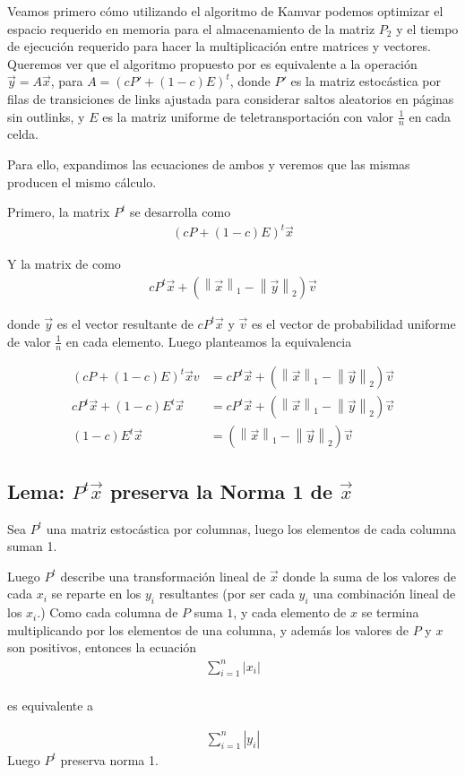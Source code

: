 Veamos primero cómo utilizando el algoritmo de Kamvar podemos optimizar el espacio requerido en memoria para el almacenamiento de la matriz $P_2$ y el tiempo de ejecución requerido para hacer la multiplicación entre matrices y vectores.\\

\newcommand{\vectornorm}[1]{\left\|#1\right\|}
Queremos ver que el algoritmo propuesto por \cite[Algoritmo 1]{Kamvar2003} es equivalente
a la operación $\vec{y} = A\vec{x}$, para $A=(cP' + (1-c)E)^{t}$, donde $P'$ es la matriz 
estocástica por filas de transiciones de links ajustada para considerar saltos aleatorios
en páginas sin outlinks, y $E$ es la matriz uniforme de teletransportación con valor $\frac{1}{n}$ en cada celda.

Para ello, expandimos las ecuaciones de ambos y veremos que las mismas producen el mismo cálculo.

Primero, la matrix $P^{t}$ se desarrolla como 
\begin{align*}
(cP + (1 - c)E)^{t} \vec{x}
\end{align*}

Y la matrix de \cite[Algoritmo 1]{Kamvar 2003} como
\begin{align*}
cP^{t}\vec{x} + (\vectornorm{\vec{x}}_1 - \vectornorm{\vec{y}}_2)\vec{v}
\end{align*}

donde $\vec{y}$ es el vector resultante de $cP^{t}\vec{x}$ y $\vec{v}$ es el vector de probabilidad
uniforme de valor $\frac{1}{n}$ en cada elemento. Luego planteamos la equivalencia

\begin{align*}
(cP + (1-c)E)^{t} \vec{x} v&= cP^{t}\vec{x} + (\vectornorm{\vec{x}}_1 - \vectornorm{\vec{y}}_2)\vec{v} \\
cP^{t}\vec{x} + (1-c)E^{t}\vec{x} &= cP^{t}\vec{x} + (\vectornorm{\vec{x}}_1 - \vectornorm{\vec{y}}_2)\vec{v} \\
(1-c)E^{t}\vec{x} &= (\vectornorm{\vec{x}}_1 - \vectornorm{\vec{y}}_2)\vec{v}
\end{align*}

\subsection{Lema: $P^{t} \vec{x}$ preserva la Norma 1 de $\vec{x}$}
Sea $P^{t}$ una matriz estocástica por columnas, luego los elementos de cada columna suman 1.

Luego $P^{t}$ describe una transformación lineal de $\vec{x}$ donde la suma de los valores de cada $x_i$
se reparte en los $y_i$ resultantes (por ser cada $y_i$ una combinación lineal de los $x_i$.) 
Como cada columna de $P$ suma $1$, y cada elemento de $x$  se termina
multiplicando por los elementos de una columna, y además los valores de $P$ y $ x$  son positivos,
entonces la ecuación
\begin{align*}
\sum_{i=1}^{n} |x_i| \\
\end{align*}
\centerline{es equivalente a}
\begin{align*}
\sum_{i=1}^{n} |y_i|
\end{align*}
Luego $P^{t}$ preserva norma 1.

